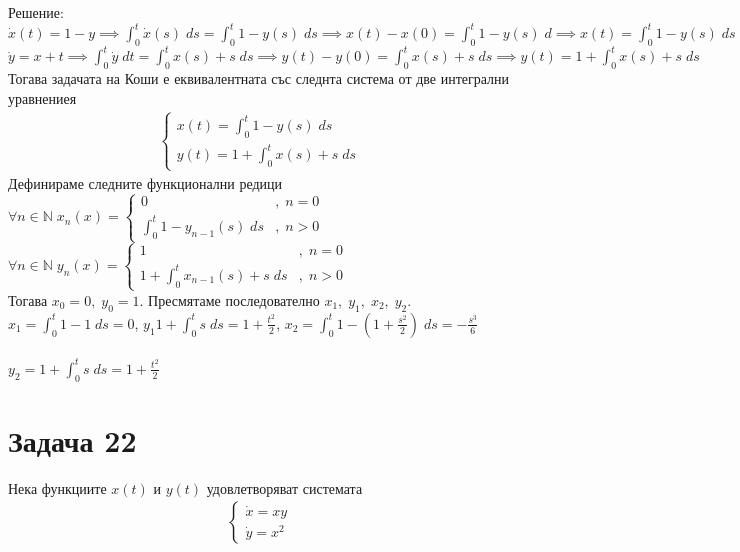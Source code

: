 \documentclass[a4paper, 12pt, oneside]{article}
\newcommand{\N}{\mathbb{N}}
\begin{document}
Решение: \\

$\dot{x}(t) = 1 - y \implies
\displaystyle\int_0^t \dot{x}(s) \; ds = \displaystyle\int_0^t 1 - y(s) \; ds \implies
x(t) - x(0) = \displaystyle\int_0^t 1 - y(s) \; d \implies x(t) = \displaystyle\int_0^t 1 - y(s) \; ds$ \\

$\dot{y} = x + t \implies \displaystyle\int_0^t \dot{y} \; dt = \displaystyle\int_0^t x(s) + s \; ds \implies
y(t) - y(0) = \displaystyle\int_0^t x(s) + s \; ds \implies y(t) = 1 + \displaystyle\int_0^t x(s) + s \; ds$
Тогава задачата на Коши е еквивалентната със следнта система от две интегрални уравнениея
\begin{align*}
    \begin{cases}
        x(t) = \displaystyle\int_0^t 1 - y(s) \; ds \\
        y(t) = 1 + \displaystyle\int_0^t x(s) + s \; ds
    \end{cases}
\end{align*}
Дефинираме следните функционални редици \\
$\forall n \in \N \; x_n(x) = \begin{cases}
    0 & , \; n = 0 \\
    \displaystyle\int_0^t 1 - y_{n - 1}(s) \; ds & , \; n > 0
\end{cases}$
$\forall n \in \N \; y_n(x) = \begin{cases}
    1 & , \; n = 0 \\
    1 + \displaystyle\int_0^t x_{n - 1}(s) + s \; ds & , \; n > 0
\end{cases}$ \\

Тогава $x_0 = 0, \; y_0 = 1$. Пресмятаме последователно $x_1, \; y_1, \; x_2, \; y_2$. \\

$x_1 = \displaystyle\int_0^t 1 - 1 \; ds = 0$, \; $y_1 1 + \displaystyle\int_0^t s \; ds = 1 + \frac{t^2}{2}$,
$x_2 = \displaystyle\int_0^t 1 - (1 + \frac{s^2}{2}) \; ds = -\frac{s^3}{6}$ \\\\

$y_2 = 1 + \displaystyle\int_0^t s \; ds = 1 + \frac{t^2}{2}$

\section{Задача 22}
Нека функциите $x(t)$ и $y(t)$ удовлетворяват системата
\begin{align*}
    \begin{cases}
        \dot{x} = xy \\
        \dot{y} = x^2
    \end{cases}
\end{align*}
\end{document}
